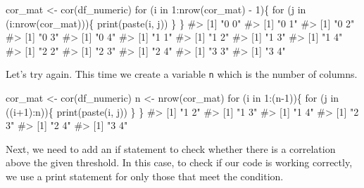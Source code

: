 \documentclass[
  letterpaper,
]{latex/krantz}
\makeatletter
\newenvironment{Shaded}{\begin{snugshade}}{\end{snugshade}}
\newcommand{\CommentTok}[1]{\textcolor[rgb]{0.37,0.37,0.37}{#1}}
\newcommand{\ControlFlowTok}[1]{\textcolor[rgb]{0.00,0.23,0.31}{#1}}
\newcommand{\DecValTok}[1]{\textcolor[rgb]{0.68,0.00,0.00}{#1}}
\newcommand{\FunctionTok}[1]{\textcolor[rgb]{0.28,0.35,0.67}{#1}}
\newcommand{\NormalTok}[1]{\textcolor[rgb]{0.00,0.23,0.31}{#1}}
\newcommand{\OtherTok}[1]{\textcolor[rgb]{0.00,0.23,0.31}{#1}}
\newcommand{\SpecialCharTok}[1]{\textcolor[rgb]{0.37,0.37,0.37}{#1}}
\newenvironment{kframe}{%
\medskip{}
\setlength{\fboxsep}{.8em}
 \def\at@end@of@kframe{}%
 \ifinner\ifhmode%
  \def\at@end@of@kframe{\end{minipage}}%
  \begin{minipage}{\columnwidth}%
 \fi\fi%
 \def\FrameCommand##1{\hskip\@totalleftmargin \hskip-\fboxsep
 \colorbox{shadecolor}{##1}\hskip-\fboxsep
     \hskip-\linewidth \hskip-\@totalleftmargin \hskip\columnwidth}%
 \MakeFramed {\advance\hsize-\width
   \@totalleftmargin\z@ \linewidth\hsize
   \@setminipage}}%
 {\par\unskip\endMakeFramed%
 \at@end@of@kframe}
\renewenvironment{Shaded}{\begin{kframe}}{\end{kframe}}
\makeatother
\begin{document}
\begin{Shaded}
\begin{Highlighting}[]
\NormalTok{cor\_mat }\OtherTok{\textless{}{-}} \FunctionTok{cor}\NormalTok{(df\_numeric)}
\ControlFlowTok{for}\NormalTok{ (i }\ControlFlowTok{in} \DecValTok{1}\SpecialCharTok{:}\FunctionTok{nrow}\NormalTok{(cor\_mat) }\SpecialCharTok{{-}} \DecValTok{1}\NormalTok{)\{}
  \ControlFlowTok{for}\NormalTok{ (j }\ControlFlowTok{in}\NormalTok{ (i}\SpecialCharTok{:}\FunctionTok{nrow}\NormalTok{(cor\_mat)))\{}
    \FunctionTok{print}\NormalTok{(}\FunctionTok{paste}\NormalTok{(i, j))}
\NormalTok{  \}}
\NormalTok{\}}
\CommentTok{\#\textgreater{} [1] "0 0"}
\CommentTok{\#\textgreater{} [1] "0 1"}
\CommentTok{\#\textgreater{} [1] "0 2"}
\CommentTok{\#\textgreater{} [1] "0 3"}
\CommentTok{\#\textgreater{} [1] "0 4"}
\CommentTok{\#\textgreater{} [1] "1 1"}
\CommentTok{\#\textgreater{} [1] "1 2"}
\CommentTok{\#\textgreater{} [1] "1 3"}
\CommentTok{\#\textgreater{} [1] "1 4"}
\CommentTok{\#\textgreater{} [1] "2 2"}
\CommentTok{\#\textgreater{} [1] "2 3"}
\CommentTok{\#\textgreater{} [1] "2 4"}
\CommentTok{\#\textgreater{} [1] "3 3"}
\CommentTok{\#\textgreater{} [1] "3 4"}
\end{Highlighting}
\end{Shaded}

Let's try again. This time we create a variable \texttt{n} which is the
number of columns.

\begin{Shaded}
\begin{Highlighting}[]
\NormalTok{cor\_mat }\OtherTok{\textless{}{-}} \FunctionTok{cor}\NormalTok{(df\_numeric)}
\NormalTok{n }\OtherTok{\textless{}{-}} \FunctionTok{nrow}\NormalTok{(cor\_mat)}
\ControlFlowTok{for}\NormalTok{ (i }\ControlFlowTok{in} \DecValTok{1}\SpecialCharTok{:}\NormalTok{(n}\DecValTok{{-}1}\NormalTok{))\{}
  \ControlFlowTok{for}\NormalTok{ (j }\ControlFlowTok{in}\NormalTok{ ((i}\SpecialCharTok{+}\DecValTok{1}\NormalTok{)}\SpecialCharTok{:}\NormalTok{n))\{}
    \FunctionTok{print}\NormalTok{(}\FunctionTok{paste}\NormalTok{(i, j))}
\NormalTok{  \}}
\NormalTok{\}}
\CommentTok{\#\textgreater{} [1] "1 2"}
\CommentTok{\#\textgreater{} [1] "1 3"}
\CommentTok{\#\textgreater{} [1] "1 4"}
\CommentTok{\#\textgreater{} [1] "2 3"}
\CommentTok{\#\textgreater{} [1] "2 4"}
\CommentTok{\#\textgreater{} [1] "3 4"}
\end{Highlighting}
\end{Shaded}

Next, we need to add an if statement to check whether there is a
correlation above the given threshold. In this case, to check if our
code is working correctly, we use a print statement for only those that
meet the condition.
\end{document}
